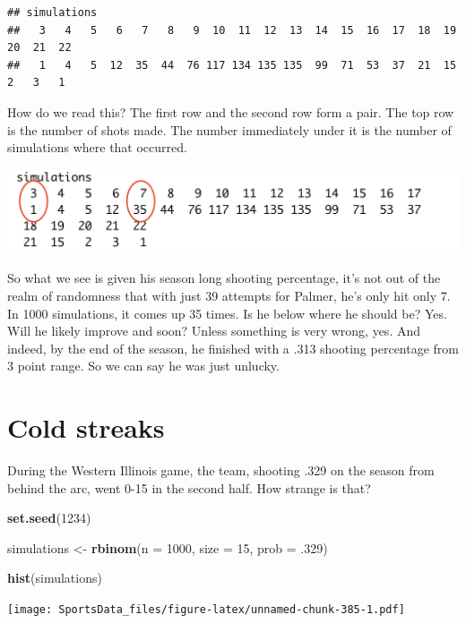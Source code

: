 \documentclass[
]{book}
\newenvironment{Shaded}{\begin{snugshade}}{\end{snugshade}}
\newcommand{\DataTypeTok}[1]{\textcolor[rgb]{0.13,0.29,0.53}{#1}}
\newcommand{\DecValTok}[1]{\textcolor[rgb]{0.00,0.00,0.81}{#1}}
\newcommand{\FloatTok}[1]{\textcolor[rgb]{0.00,0.00,0.81}{#1}}
\newcommand{\KeywordTok}[1]{\textcolor[rgb]{0.13,0.29,0.53}{\textbf{#1}}}
\newcommand{\NormalTok}[1]{#1}
\newcommand{\StringTok}[1]{\textcolor[rgb]{0.31,0.60,0.02}{#1}}
\begin{document}
\begin{verbatim}
## simulations
##   3   4   5   6   7   8   9  10  11  12  13  14  15  16  17  18  19  20  21  22 
##   1   4   5  12  35  44  76 117 134 135 135  99  71  53  37  21  15   2   3   1
\end{verbatim}

How do we read this? The first row and the second row form a pair. The top row is the number of shots made. The number immediately under it is the number of simulations where that occurred.

\includegraphics[width=23.06in]{images/simulations1}

So what we see is given his season long shooting percentage, it's not out of the realm of randomness that with just 39 attempts for Palmer, he's only hit only 7. In 1000 simulations, it comes up 35 times. Is he below where he should be? Yes. Will he likely improve and soon? Unless something is very wrong, yes. And indeed, by the end of the season, he finished with a .313 shooting percentage from 3 point range. So we can say he was just unlucky.

\hypertarget{cold-streaks}{%
\section{Cold streaks}\label{cold-streaks}}

During the Western Illinois game, the team, shooting .329 on the season from behind the arc, went 0-15 in the second half. How strange is that?

\begin{Shaded}
\begin{Highlighting}[]
\KeywordTok{set.seed}\NormalTok{(}\DecValTok{1234}\NormalTok{)}

\NormalTok{simulations <-}\StringTok{ }\KeywordTok{rbinom}\NormalTok{(}\DataTypeTok{n =} \DecValTok{1000}\NormalTok{, }\DataTypeTok{size =} \DecValTok{15}\NormalTok{, }\DataTypeTok{prob =} \FloatTok{.329}\NormalTok{)}

\KeywordTok{hist}\NormalTok{(simulations)}
\end{Highlighting}
\end{Shaded}

\texttt{[image: SportsData\_files/figure-latex/unnamed-chunk-385-1.pdf]}
\end{document}
